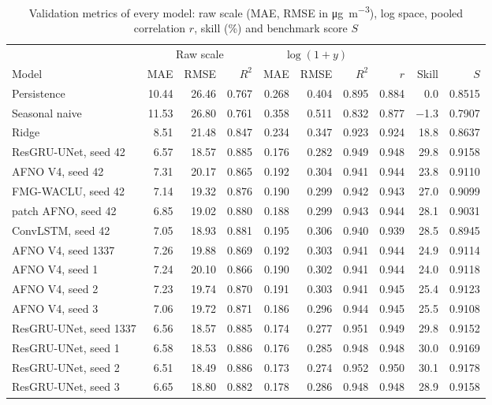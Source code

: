 \documentclass[journal]{IEEEtran}
\newcommand{\ugm}{\si{\micro\gram\per\cubic\metre}}
\begin{document}
\begin{table}[tp]
\centering
\caption{Validation metrics of every model: raw scale (MAE, RMSE in \ugm), log space, pooled correlation $r$, skill (\%) and benchmark score $S$}
\label{tab:regfull}
\begin{tabular}{@{}lrrrrrrrrr@{}}
\toprule
 & \multicolumn{3}{c}{Raw scale} & \multicolumn{3}{c}{$\log(1+y)$} & & & \\
\cmidrule(lr){2-4}\cmidrule(lr){5-7}
Model & MAE & RMSE & $R^2$ & MAE & RMSE & $R^2$ & $r$ & Skill & $S$ \\
\midrule
Persistence & 10.44 & 26.46 & 0.767 & 0.268 & 0.404 & 0.895 & 0.884 & 0.0 & 0.8515 \\
Seasonal naive & 11.53 & 26.80 & 0.761 & 0.358 & 0.511 & 0.832 & 0.877 & $-$1.3 & 0.7907 \\
Ridge & 8.51 & 21.48 & 0.847 & 0.234 & 0.347 & 0.923 & 0.924 & 18.8 & 0.8637 \\
\midrule
ResGRU-UNet, seed 42 & 6.57 & 18.57 & 0.885 & 0.176 & 0.282 & 0.949 & 0.948 & 29.8 & 0.9158 \\
AFNO V4, seed 42 & 7.31 & 20.17 & 0.865 & 0.192 & 0.304 & 0.941 & 0.944 & 23.8 & 0.9110 \\
FMG-WACLU, seed 42 & 7.14 & 19.32 & 0.876 & 0.190 & 0.299 & 0.942 & 0.943 & 27.0 & 0.9099 \\
patch AFNO, seed 42 & 6.85 & 19.02 & 0.880 & 0.188 & 0.299 & 0.943 & 0.944 & 28.1 & 0.9031 \\
ConvLSTM, seed 42 & 7.05 & 18.93 & 0.881 & 0.195 & 0.306 & 0.940 & 0.939 & 28.5 & 0.8945 \\
\midrule
AFNO V4, seed 1337 & 7.26 & 19.88 & 0.869 & 0.192 & 0.303 & 0.941 & 0.944 & 24.9 & 0.9114 \\
AFNO V4, seed 1 & 7.24 & 20.10 & 0.866 & 0.190 & 0.302 & 0.941 & 0.944 & 24.0 & 0.9118 \\
AFNO V4, seed 2 & 7.23 & 19.74 & 0.870 & 0.191 & 0.303 & 0.941 & 0.945 & 25.4 & 0.9123 \\
AFNO V4, seed 3 & 7.06 & 19.72 & 0.871 & 0.186 & 0.296 & 0.944 & 0.945 & 25.5 & 0.9108 \\
ResGRU-UNet, seed 1337 & 6.56 & 18.57 & 0.885 & 0.174 & 0.277 & 0.951 & 0.949 & 29.8 & 0.9152 \\
ResGRU-UNet, seed 1 & 6.58 & 18.53 & 0.886 & 0.176 & 0.285 & 0.948 & 0.948 & 30.0 & 0.9169 \\
ResGRU-UNet, seed 2 & 6.51 & 18.49 & 0.886 & 0.173 & 0.274 & 0.952 & 0.950 & 30.1 & 0.9178 \\
ResGRU-UNet, seed 3 & 6.65 & 18.80 & 0.882 & 0.178 & 0.286 & 0.948 & 0.948 & 28.9 & 0.9158 \\

\end{tabular}
\end{table}
\end{document}
